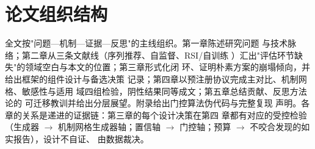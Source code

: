 \section{论文组织结构}
全文按"问题—机制—证据—反思"的主线组织。第一章陈述研究问题
与技术脉络；第二章从三条文献线（序列推荐、自监督、RSI/自训练
）汇出"评估环节缺失"的领域空白与本文的位置；第三章形式化闭
环、证明朴素方案的崩塌倾向，并给出框架的组件设计与备选决策
记录；第四章以预注册协议完成主对比、机制网格、敏感性与适用
域四组检验，阴性结果同等成文；第五章总结贡献、反思方法论的
可迁移教训并给出分层展望。附录给出门控算法伪代码与完整复现
声明。各章的关系是递进的证据链：第三章的每个设计决策在第四
章都有对应的受控检验（生成器 $\to$ 机制网格生成器轴；置信轴
$\to$ 门控轴；预算 $\to$ 不咬合发现的如实报告），设计不自证、
由数据裁决。
